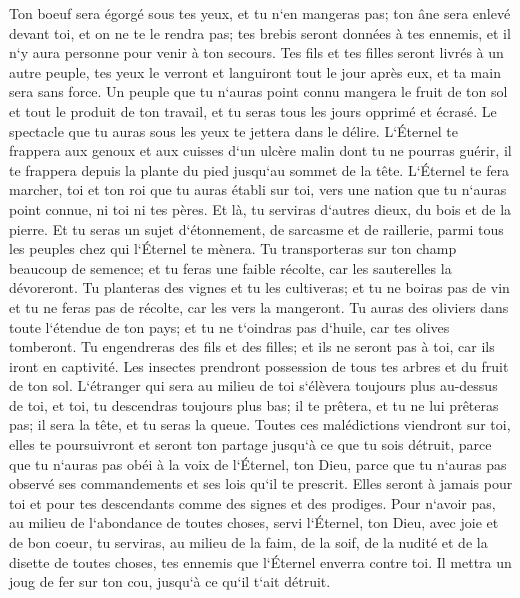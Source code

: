 \verse Ton boeuf sera égorgé sous tes yeux, et tu n`en mangeras pas; ton âne sera enlevé devant toi, et on ne te le rendra pas; tes brebis seront données à tes ennemis, et il n`y aura personne pour venir à ton secours. 
\verse Tes fils et tes filles seront livrés à un autre peuple, tes yeux le verront et languiront tout le jour après eux, et ta main sera sans force. 
\verse Un peuple que tu n`auras point connu mangera le fruit de ton sol et tout le produit de ton travail, et tu seras tous les jours opprimé et écrasé. 
\verse Le spectacle que tu auras sous les yeux te jettera dans le délire. 
\verse L`Éternel te frappera aux genoux et aux cuisses d`un ulcère malin dont tu ne pourras guérir, il te frappera depuis la plante du pied jusqu`au sommet de la tête. 
\verse L`Éternel te fera marcher, toi et ton roi que tu auras établi sur toi, vers une nation que tu n`auras point connue, ni toi ni tes pères. Et là, tu serviras d`autres dieux, du bois et de la pierre. 
\verse Et tu seras un sujet d`étonnement, de sarcasme et de raillerie, parmi tous les peuples chez qui l`Éternel te mènera. 
\verse Tu transporteras sur ton champ beaucoup de semence; et tu feras une faible récolte, car les sauterelles la dévoreront. 
\verse Tu planteras des vignes et tu les cultiveras; et tu ne boiras pas de vin et tu ne feras pas de récolte, car les vers la mangeront. 
\verse Tu auras des oliviers dans toute l`étendue de ton pays; et tu ne t`oindras pas d`huile, car tes olives tomberont. 
\verse Tu engendreras des fils et des filles; et ils ne seront pas à toi, car ils iront en captivité. 
\verse Les insectes prendront possession de tous tes arbres et du fruit de ton sol. 
\verse L`étranger qui sera au milieu de toi s`élèvera toujours plus au-dessus de toi, et toi, tu descendras toujours plus bas; 
\verse il te prêtera, et tu ne lui prêteras pas; il sera la tête, et tu seras la queue. 
\verse Toutes ces malédictions viendront sur toi, elles te poursuivront et seront ton partage jusqu`à ce que tu sois détruit, parce que tu n`auras pas obéi à la voix de l`Éternel, ton Dieu, parce que tu n`auras pas observé ses commandements et ses lois qu`il te prescrit. 
\verse Elles seront à jamais pour toi et pour tes descendants comme des signes et des prodiges. 
\verse Pour n`avoir pas, au milieu de l`abondance de toutes choses, servi l`Éternel, ton Dieu, avec joie et de bon coeur, 
\verse tu serviras, au milieu de la faim, de la soif, de la nudité et de la disette de toutes choses, tes ennemis que l`Éternel enverra contre toi. Il mettra un joug de fer sur ton cou, jusqu`à ce qu`il t`ait détruit. 
